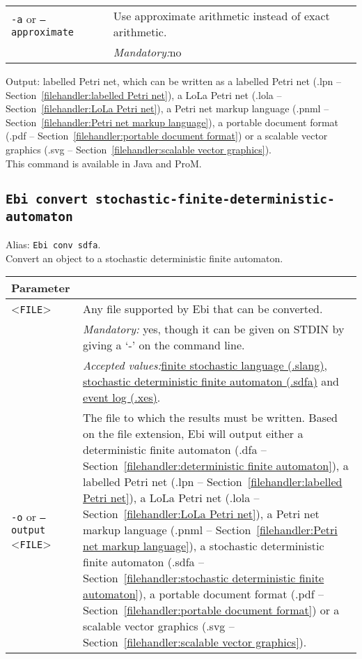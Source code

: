 {\begin{tabularx}{\linewidth}{lX}
\texttt{-a} or \texttt{--approximate} & Use approximate arithmetic instead of exact arithmetic.\\
&\textit{Mandatory:}\quad no\\
\bottomrule
\end{tabularx}
\noindent Output: labelled Petri net, which can be written as a labelled Petri net (.lpn -- Section~\ref{filehandler:labelled Petri net}), a LoLa Petri net (.lola -- Section~\ref{filehandler:LoLa Petri net}), a Petri net markup language (.pnml -- Section~\ref{filehandler:Petri net markup language}), a portable document format (.pdf -- Section~\ref{filehandler:portable document format}) or a scalable vector graphics (.svg -- Section~\ref{filehandler:scalable vector graphics}).
\\This command is available in Java and ProM.
\subsection{\texttt{Ebi convert stochastic-finite-deterministic-automaton}}
\label{command:Ebi convert stochastic-finite-deterministic-automaton}
Alias: \texttt{Ebi conv sdfa}.\\
Convert an object to a stochastic deterministic finite automaton.\\
\begin{tabularx}{\linewidth}{lX}
\toprule
Parameter \\\midrule
<\texttt{FILE}>&Any file supported by Ebi that can be converted.\\
&\textit{Mandatory:} \quad yes, though it can be given on STDIN by giving a `-' on the command line.\\
&\textit{Accepted values:}\quad \hyperref[filehandler:finite stochastic language]{finite stochastic language (.slang)}, \hyperref[filehandler:stochastic deterministic finite automaton]{stochastic deterministic finite automaton (.sdfa)} and \hyperref[filehandler:event log]{event log (.xes)}.\\
\texttt{-o} or \texttt{--output} <\texttt{FILE}> &
The file to which the results must be written. Based on the file extension, Ebi will output either a deterministic finite automaton (.dfa -- Section~\ref{filehandler:deterministic finite automaton}), a labelled Petri net (.lpn -- Section~\ref{filehandler:labelled Petri net}), a LoLa Petri net (.lola -- Section~\ref{filehandler:LoLa Petri net}), a Petri net markup language (.pnml -- Section~\ref{filehandler:Petri net markup language}), a stochastic deterministic finite automaton (.sdfa -- Section~\ref{filehandler:stochastic deterministic finite automaton}), a portable document format (.pdf -- Section~\ref{filehandler:portable document format}) or a scalable vector graphics (.svg -- Section~\ref{filehandler:scalable vector graphics}).

\end{tabularx}}
